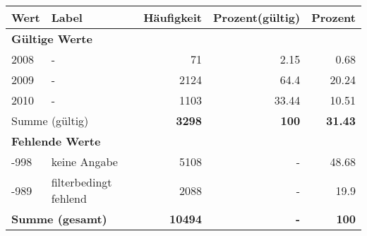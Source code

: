      \begin{longtable}{lXrrr}
     \toprule
     \textbf{Wert} & \textbf{Label} & \textbf{Häufigkeit} & \textbf{Prozent(gültig)} & \textbf{Prozent} \\
     \endhead
     \midrule
     \multicolumn{5}{l}{\textbf{Gültige Werte}}\\

     2008 &
     \multicolumn{1}{X}{ -  } &


       \num{71} &
       \num[round-mode=places,round-precision=2]{2.15} &
         \num[round-mode=places,round-precision=2]{0.68} \\

     2009 &
     \multicolumn{1}{X}{ -  } &


       \num{2124} &
       \num[round-mode=places,round-precision=2]{64.4} &
         \num[round-mode=places,round-precision=2]{20.24} \\

     2010 &
     \multicolumn{1}{X}{ -  } &


       \num{1103} &
       \num[round-mode=places,round-precision=2]{33.44} &
         \num[round-mode=places,round-precision=2]{10.51} \\
     \midrule
     \multicolumn{2}{l}{Summe (gültig)} &
       \textbf{\num{3298}} &
     \textbf{\num{100}} &
       \textbf{\num[round-mode=places,round-precision=2]{31.43}} \\
     \multicolumn{5}{l}{\textbf{Fehlende Werte}}\\
       -998 &
       keine Angabe &
         \num{5108} &
        - &
         \num[round-mode=places,round-precision=2]{48.68} \\
       -989 &
       filterbedingt fehlend &
         \num{2088} &
        - &
         \num[round-mode=places,round-precision=2]{19.9} \\
     \midrule
     \multicolumn{2}{l}{\textbf{Summe (gesamt)}} &
          \textbf{\num{10494}} &
        \textbf{-} &
        \textbf{\num{100}} \\
     \bottomrule
     \end{longtable}
     

